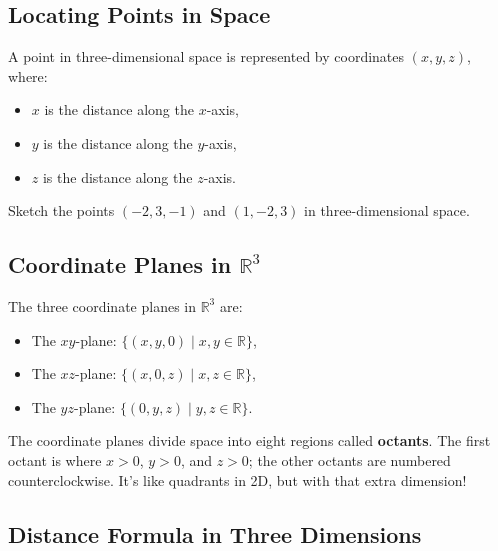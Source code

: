 \documentclass{article}
\begin{document}
\subsection*{Locating Points in Space}

A point in three-dimensional space is represented by coordinates \((x, y, z)\), where:
\begin{itemize}
    \item \(x\) is the distance along the \(x\)-axis,
    \item \(y\) is the distance along the \(y\)-axis,
    \item \(z\) is the distance along the \(z\)-axis.
\end{itemize}

\begin{exercisebox}
    Sketch the points \((-2, 3, -1)\) and \((1, -2, 3)\) in three-dimensional space.
\end{exercisebox}

\subsection*{Coordinate Planes in \(\mathbb{R}^3\)}

The three coordinate planes in \(\mathbb{R}^3\) are:
\begin{itemize}
    \item The \(xy\)-plane: \(\{(x, y, 0) \mid x, y \in \mathbb{R}\}\),
    \item The \(xz\)-plane: \(\{(x, 0, z) \mid x, z \in \mathbb{R}\}\),
    \item The \(yz\)-plane: \(\{(0, y, z) \mid y, z \in \mathbb{R}\}\).
\end{itemize}

\begin{notebox}
    The coordinate planes divide space into eight regions called \textbf{octants}. The first octant is where \(x > 0\), \(y > 0\), and \(z > 0\); the other octants are numbered counterclockwise.
    It's like quadrants in 2D, but with that extra dimension!
\end{notebox}

\subsection*{Distance Formula in Three Dimensions}
\end{document}
